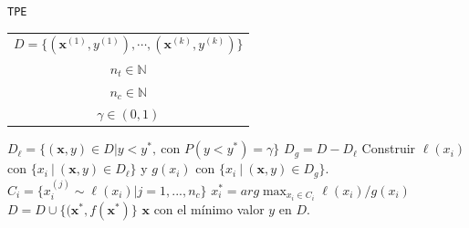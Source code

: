 \begin{algorithm}
\caption{\texttt{TPE}}
\label{alg:TPE}
\begin{algorithmic}[1]
\Require
\begin{tabular}{c}
$D = \{(\textbf{x}^{(1)},y^{(1)}), \cdots, (\textbf{x}^{(k)},y^{(k)}) \}$ \Comment{Observaciones}  \\ 
$n_t \in \mathbb{N}$ \Comment{número de iteraciones} \\ 
$n_c \in \mathbb{N}$ \Comment{número de candidatos} \\
$\gamma \in (0,1) $ \Comment{cuantil para obtener $y^*$}
\end{tabular} 

\vspace{1mm}
	\State $D_{\ell} = \{ (\textbf{x}, y) \in D | y < y^*, \ \text{con } P(y<y^*) = \gamma  \}$
	\State $D_g = D - D_{\ell}$
	 
		\State Construir $\ell(x_i)$ con $\{x_i \ | \ (\textbf{x}, y) \in D_{\ell}\}$ y $g(x_i)$ con $\{x_i \ | \ (\textbf{x}, y) \in D_g \}$.
		\State $C_i = \{ x_i^{(j)} \sim \ell(x_i)| j=1, ..., n_c \}$ 
		\State $x_{i}^* = arg \max_{x_i\in C_i} \ell(x_i)/g(x_i)$
	\EndFor
	\State $D = D \cup \{(\textbf{x}^*, f(\textbf{x}^*)\}$ 
\EndFor
\Ensure $\textbf{x}$ con el mínimo valor $y$ en $D$.
\vspace{3mm}

\end{algorithmic}
\end{algorithm}
 

